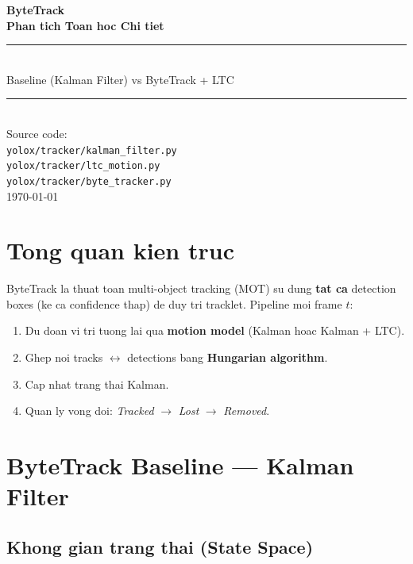 \documentclass[12pt, a4paper]{article}
\begin{document}
\begin{titlepage}
  \centering\vspace*{2.5cm}
  {\Huge\bfseries\color{primary} ByteTrack\\[0.4em]
   \Large Phan tich Toan hoc Chi tiet}\\[1.2em]
  \rule{\linewidth}{2pt}\\[1em]
  {\large\color{grey} Baseline (Kalman Filter) \quad vs \quad ByteTrack + LTC}\\[0.8em]
  \rule{\linewidth}{0.5pt}\\[2em]
  {\normalsize
    Source code:\\[0.3em]
    \texttt{yolox/tracker/kalman\_filter.py}\\
    \texttt{yolox/tracker/ltc\_motion.py}\\
    \texttt{yolox/tracker/byte\_tracker.py}}\\[3cm]
  {\color{grey}\today}
  \vfill
\end{titlepage}

\tableofcontents\newpage

\section{Tong quan kien truc}

ByteTrack la thuat toan multi-object tracking (MOT) su dung \textbf{tat ca} detection boxes
(ke ca confidence thap) de duy tri tracklet. Pipeline moi frame $t$:

\begin{enumerate}[label=\textbf{\arabic*.}]
  \item Du doan vi tri tuong lai qua \textbf{motion model} (Kalman hoac Kalman + LTC).
  \item Ghep noi tracks $\leftrightarrow$ detections bang \textbf{Hungarian algorithm}.
  \item Cap nhat trang thai Kalman.
  \item Quan ly vong doi: \textit{Tracked} $\to$ \textit{Lost} $\to$ \textit{Removed}.
\end{enumerate}

\section{ByteTrack Baseline --- Kalman Filter}

\subsection{Khong gian trang thai (State Space)}
\end{document}
